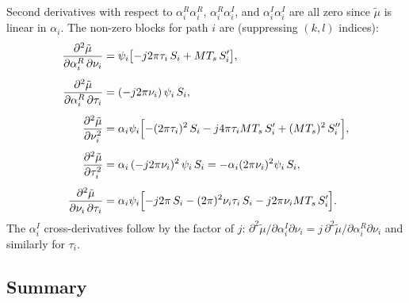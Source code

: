 \documentclass[11pt,a4paper]{article}
\begin{document}
Second derivatives with respect to $\alpha_i^R\alpha_i^R$,
$\alpha_i^R\alpha_i^I$, and $\alpha_i^I\alpha_i^I$ are all zero since
$\tilde\mu$ is linear in $\alpha_i$. The non-zero blocks for path $i$
are (suppressing $(k,l)$ indices):
\begin{align}
  \frac{\partial^2\tilde{\mu}}{\partial\alpha_i^R\,\partial\nu_i}
  &= \psi_i\bigl[-j2\pi\tau_i\,S_i + MT_s\,S_i'\bigr],
  \\[4pt]
  \frac{\partial^2\tilde{\mu}}{\partial\alpha_i^R\,\partial\tau_i}
  &= (-j2\pi\nu_i)\,\psi_i\,S_i,
  \\[4pt]
  \frac{\partial^2\tilde{\mu}}{\partial\nu_i^2}
  &= \alpha_i\psi_i\Bigl[
    -(2\pi\tau_i)^2\,S_i
    - j4\pi\tau_i MT_s\,S_i'
    + (MT_s)^2\,S_i''\Bigr],
  \\[4pt]
  \frac{\partial^2\tilde{\mu}}{\partial\tau_i^2}
  &= \alpha_i\,(-j2\pi\nu_i)^2\,\psi_i\,S_i
  = -\alpha_i(2\pi\nu_i)^2\psi_i\,S_i,
  \\[4pt]
  \frac{\partial^2\tilde{\mu}}{\partial\nu_i\,\partial\tau_i}
  &= \alpha_i\psi_i\Bigl[
    -j2\pi\,S_i
    -(2\pi)^2\nu_i\tau_i\,S_i
    -j2\pi\nu_i MT_s\,S_i'\Bigr].
\end{align}
The $\alpha_i^I$ cross-derivatives follow by the factor of $j$:
$\partial^2\tilde{\mu}/\partial\alpha_i^I\partial\nu_i
= j\,\partial^2\tilde{\mu}/\partial\alpha_i^R\partial\nu_i$ and
similarly for $\tau_i$.

\subsection{Summary}
\end{document}

